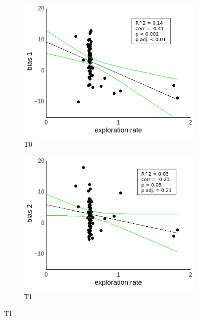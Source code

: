 \documentclass[a4paper]{scrreprt}
\begin{document}
\begin{figure}
\centering
\begin{subfigure}[b]{0.49\textwidth}
        \includegraphics[width=\textwidth]{figs/sec3/temp/temp_diff_1_mod2mod2.jpeg}
        \caption{T0}
    \end{subfigure}
    \begin{subfigure}[b]{0.49\textwidth}
        \includegraphics[width=\textwidth]{figs/sec3/temp/temp_diff_2_mod2mod2.jpeg}
        \caption{T1}
    \end{subfigure}


\end{figure}
\end{document}
